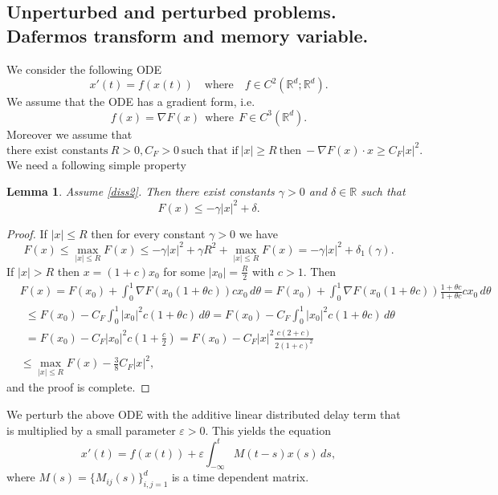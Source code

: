 \documentclass[11pt, leqno]{amsart}
\newtheorem{lem}[thm]{Lemma}
\theoremstyle{definition}
\def\R{\mathbb{R}}
\begin{document}
\subsection{Unperturbed and perturbed problems. Dafermos transform and memory variable.} We consider the following ODE
\begin{equation}
	x'(t) = f(x(t)) \quad \textrm{where}\quad f\in C^2(\R^d;\R^d).  \label{eq:ODE}
\end{equation}
We assume that the ODE has a gradient form, i.e.
\begin{equation}\label{gradient}
f(x) = \nabla F(x) \ \ \textrm{where} \  \ F\in C^3(\R^d).
\end{equation}
Moreover we assume that 
\begin{equation}\label{diss2}
	\text{there exist constants}\  R>0, C_F>0\ \text{such that if}\ |x|\geq R\ \text{then}\ -\nabla F(x)\cdot x\geq C_F|x|^2. 
\end{equation}
We need a following simple property
\begin{lem}
	Assume \eqref{diss2}. Then there exist constants $\gamma>0$ and $\delta\in \R$ such that
	\begin{equation}\label{diss}
		F(x) \leq -\gamma |x|^2 + \delta.
	\end{equation}
\end{lem}
\begin{proof}
	If $|x|\leq R$ then for every constant $\gamma > 0$ we have 
	$$
	F(x) \leq \max_{|x|\leq R}F(x) \leq -\gamma |x|^2 + {\gamma} R^2 + \max_{|x|\leq R}F(x) = -\gamma |x|^2 + \delta_1(\gamma).$$
	If $|x|>R$ then $x=(1+c)x_0$ for some $|x_0|=\frac{R}{2}$ with $c>1$. Then
	\begin{align*}
	& F(x) = F(x_0) + \int_0^1 \nabla F(x_0(1+\theta c)) c x_0 \, d\theta = F(x_0) + \int_0^1 \nabla F(x_0(1+\theta c)) \frac{1+\theta c}{1+\theta c}c x_0 \, d\theta \\
	& \ \ \leq  F(x_0) - C_F \int_0^1 |x_0|^2c(1+\theta c) \, d\theta = F(x_0) - C_F \int_0^1 |x_0|^2c(1+\theta c) \, d\theta \\
	& \ \  = F(x_0) - C_F |x_0|^2c \left(1+\frac{c}{2}\right) = F(x_0) - C_F |x|^2\frac{c \left(2+c\right)}{2(1+c)^2}\\
	& \leq  \max_{|x|\leq R}F(x) - \frac{3}{8}C_F |x|^2,
	\end{align*}
	and the proof is complete. 
\end{proof}
 We perturb the above ODE with the additive linear distributed delay term that is multiplied by a small parameter $\varepsilon>0$.  This yields the equation
\begin{equation}
	x'(t) = f(x(t)) + \varepsilon\int_{-\infty}^t M(t-s) x(s)\, ds,  \label{eq:DDE}
\end{equation}
where $M(s) = \{M_{ij}(s)\}_{i,j=1}^d$ is a time dependent matrix.
\end{document}
